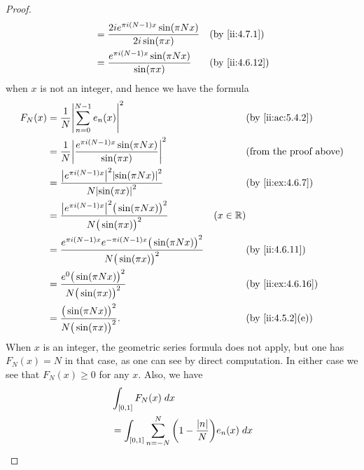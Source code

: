 \begin{proof}
\begin{align*}
                                & = \dfrac{2i e^{\pi i (N - 1) x} \sin(\pi N x)}{2i \sin(\pi x)}                                                           &  & \by{ii:4.7.1}             \\
                                & = \dfrac{e^{\pi i (N - 1) x} \sin(\pi N x)}{\sin(\pi x)}                                                                 &  & \by{ii:4.6.12}
  \end{align*}
  when \(x\) is not an integer, and hence we have the formula
  \begin{align*}
    F_N(x) & = \dfrac{1}{N} \abs{\sum_{n = 0}^{N - 1} e_n(x)}^2                                                       &            & \by{ii:ac:5.4.2}              \\
           & = \dfrac{1}{N} \abs{\dfrac{e^{\pi i (N - 1) x} \sin(\pi N x)}{\sin(\pi x)}}^2                            &            & \text{(from the proof above)} \\
           & = \dfrac{\abs{e^{\pi i (N - 1) x}}^2 \abs{\sin(\pi N x)}^2}{N \abs{\sin(\pi x)}^2}                       &            & \by{ii:ex:4.6.7}              \\
           & = \dfrac{\abs{e^{\pi i (N - 1) x}}^2 \big(\sin(\pi N x)\big)^2}{N \big(\sin(\pi x)\big)^2}               & (x \in \R)                                 \\
           & = \dfrac{e^{\pi i (N - 1) x} e^{- \pi i (N - 1) x} \big(\sin(\pi N x)\big)^2}{N \big(\sin(\pi x)\big)^2} &            & \by{ii:4.6.11}                \\
           & = \dfrac{e^0 \big(\sin(\pi N x)\big)^2}{N \big(\sin(\pi x)\big)^2}                                       &            & \by{ii:ex:4.6.16}             \\
           & = \dfrac{\big(\sin(\pi N x)\big)^2}{N \big(\sin(\pi x)\big)^2}.                                          &            & \by{ii:4.5.2}[e]
  \end{align*}
  When \(x\) is an integer, the geometric series formula does not apply, but one has \(F_N(x) = N\) in that case, as one can see by direct computation.
  In either case we see that \(F_N(x) \geq 0\) for any \(x\).
  Also, we have
  \begin{align*}
     & \int_{[0, 1]} F_N(x) \; dx                                                                                                                    \\
     & = \int_{[0, 1]} \sum_{n = -N}^N \bigg(1 - \dfrac{\abs{n}}{N}\bigg) e_n(x) \; dx                                                               \\

\end{align*}
\end{proof}
